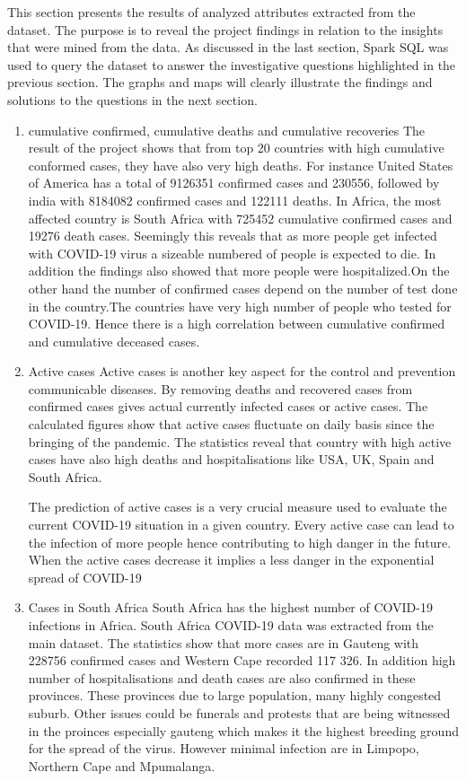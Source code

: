 \documentclass[12pt]{article}
\begin{document}
This section presents the results of analyzed attributes extracted from the dataset. The purpose is to reveal the project findings  in relation to the insights that were mined from the data. As discussed in the last section, Spark SQL was used to query the dataset to answer the  investigative questions highlighted in the previous section. The graphs and maps will clearly illustrate the findings and solutions to the  questions in the next section.  

\begin{enumerate}
    \item cumulative confirmed, cumulative deaths  and cumulative recoveries
    The result of the project shows that  from top 20 countries with high cumulative conformed cases, they have also very high deaths. For instance United States of America has a total of 9126351 confirmed cases and 230556, followed by india with 8184082 confirmed cases and 122111 deaths. In Africa, the most affected country is South Africa with 725452 cumulative confirmed cases and 19276 death cases. Seemingly this reveals that as more people get infected with COVID-19 virus a sizeable numbered of people is expected to die. In addition the findings also showed that more people were hospitalized.On the other hand the number of confirmed cases depend on the number of test done in the country.The countries have very high number of people who tested for COVID-19.  Hence there is a high correlation between cumulative confirmed and  cumulative deceased cases. 
    
    \item Active cases
    Active cases is another key aspect for the control and prevention communicable diseases. By removing deaths and recovered cases from confirmed cases gives actual currently infected cases or active cases. The calculated figures show that active cases fluctuate on  daily basis since the bringing of the pandemic. The statistics reveal that country with high active cases have also high deaths and hospitalisations like USA, UK, Spain and South Africa.
    
    The prediction of active cases is a very crucial measure used to evaluate the current COVID-19 situation in a given country. Every active case can lead to the infection of more people hence contributing to high danger in the future. When the active cases decrease it implies a less danger in the  exponential spread of COVID-19
    
    \item Cases in South Africa
    South Africa has the highest number of  COVID-19 infections in Africa. South Africa COVID-19 data was extracted from the main dataset. The statistics show that more cases are in Gauteng with 228756 confirmed cases and Western Cape recorded 117 326.  In addition high  number of hospitalisations and death cases are also confirmed in these provinces. These provinces due to large population, many highly congested suburb. Other issues could be funerals and protests that are being witnessed in the proinces especially gauteng which makes it the highest breeding ground for the spread of the virus. However minimal infection are in Limpopo, Northern Cape and Mpumalanga. 
    

\end{enumerate}
\end{document}
